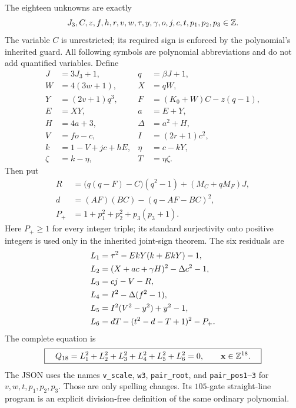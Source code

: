 The eighteen unknowns are exactly
\begin{equation}
 J_3,C,z,f,h,r,v,w,\tau,y,\gamma,o,j,c,t,p_1,p_2,p_3\in\mathbb Z.
                                                        \label{int-vars}
\end{equation}
The variable $C$ is unrestricted; its required sign is enforced by the
polynomial's inherited guard.  All following symbols are polynomial
abbreviations and do not add quantified variables.  Define
\begin{align*}
 J&=3J_3+1,&q&=\beta J+1,\\
 W&=4(3w+1),&X&=qW,\\
 Y&=(2v+1)q^3,&F&=(K_0+W)C-z(q-1),\\
 E&=XY,&a&=E+Y,\\
 H&=4a+3,&\Delta&=a^2+H,\\
 V&=fo-c,&I&=(2r+1)c^2,\\
 k&=1-V+jc+hE,&\eta&=c-kY,\\
 \zeta&=k-\eta,&T&=\eta\zeta.
\end{align*}
Then put
\begin{align*}
 R&=\bigl(q(q-F)-C\bigr)(q^2-1)+(M_C+qM_F)J,\\
 d&=(A F)(B C)-(q-AF-BC)^2,\\
 P_+&=1+p_1^2+p_2^2+p_3(p_3+1).
\end{align*}
Here $P_+\ge1$ for every integer triple; its standard surjectivity onto
positive integers is used only in the inherited joint-sign theorem.
The six residuals are
\begin{align}
 L_1&=\tau^2-EkY(k+EkY)-1,\notag\\
 L_2&=(X+ac+\gamma H)^2-\Delta c^2-1,\notag\\
 L_3&=cj-V-R,\notag\\
 L_4&=I^2-\Delta(f^2-1),\notag\\
 L_5&=I^2(V^2-y^2)+y^2-1,\notag\\
 L_6&=dT-(t^2-d-T+1)^2-P_+.                    \label{int-six-rows}
\end{align}
The complete equation is
\begin{equation}
 \boxed{\quad Q_{18}=L_1^2+L_2^2+L_3^2+L_4^2+L_5^2+L_6^2=0,
          \qquad\mathbf x\in\mathbb Z^{18}.\quad}    \label{int-Q18}
\end{equation}
The JSON uses the names \texttt{v\_scale}, \texttt{w3},
\texttt{pair\_root}, and \texttt{pair\_pos1--3} for $v,w,t,p_1,p_2,p_3$.
Those are only spelling changes.  Its $105$-gate straight-line program is
an explicit division-free definition of the same ordinary polynomial.

